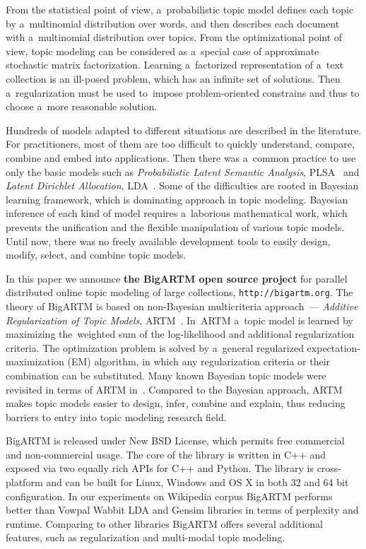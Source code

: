 \documentclass[russian]{llncs}
\begin{document}
From the statistical point of view, a~probabilistic topic model
defines each topic by a~multinomial distribution over words,
and then describes each document with a~multinomial distribution over topics.
From the optimizational point of view,
topic modeling can be considered as a~special case
of approximate stochastic matrix factorization.
Learning a~factorized representation of a~text collection
is an ill-posed problem, which has an infinite set of solutions.
Then a~regularization must be used
to~impose problem-oriented constrains
and thus to choose a~more reasonable solution.

Hundreds of models adapted to different situations are described in the literature.
For practitioners, most of them are too difficult to quickly
understand, compare, combine and embed into applications.
Then there was a~common practice to use only the basic models such as
\emph{Probabilistic Latent Semantic Analysis}, PLSA~\cite{hofmann99plsi} and
\emph{Latent Dirichlet Allocation}, LDA~\cite{blei03latent}.
Some of the difficulties are rooted in Bayesian learning framework,
which is dominating approach in topic modeling.
Bayesian inference of each kind of model requires a~laborious mathematical work,
which prevents the unification and the flexible manipulation of various topic models.
Until now, there was no freely available development tools
to easily design, modify, select, and combine topic models.

In this paper we announce \textbf{the BigARTM open source project} for
parallel distributed online topic modeling of large collections,
\texttt{http://bigartm.org}.
The theory of BigARTM is based on non-Bayesian multicriteria approach~---
\emph{Additive Regularization of Topic Models}, ARTM~\cite{voron14dan-eng}.
In~ARTM a~topic model is learned by maximizing the~weighted sum
of the log-likelihood and additional regularization criteria.
The optimization problem is solved by a~general regularized expectation-maximization (EM) algorithm,
in which any regularization criteria or their combination can be substituted.
Many known Bayesian topic models were revisited in terms of ARTM in~\cite{voron14aist,voron14mlj}.
Compared to the Bayesian approach,
ARTM makes topic models easier to design, infer, combine and explain,
thus reducing barriers to entry into topic modeling research field.

BigARTM is released under New BSD License, which permits free commercial and non-commercial usage.
The core of the library is written in C++ and exposed via two equally rich APIs for C++ and Python.
The library is cross-platform and can be built for Linux, Windows and OS X in both 32 and 64 bit configuration.
In our experiments on Wikipedia corpus BigARTM performs better than Vowpal Wabbit LDA and Gensim libraries
in terms of perplexity and runtime.
Comparing to other libraries BigARTM offers several additional features,
such as regularization and multi-modal topic modeling.
\end{document}

